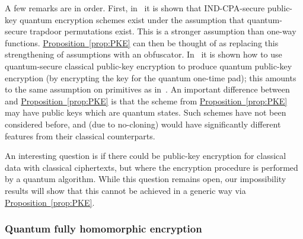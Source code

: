 \documentclass[envcountsame]{llncs}
\numberwithin{equation}{section}
\newcommand{\expref}[2]{\texorpdfstring{\hyperref[#2]{#1~\ref{#2}}}{#1~\ref{#2}}}
\begin{document}
A few remarks are in order. First, in~\cite{ABFGSS16} it is shown that IND-CPA-secure public-key quantum encryption schemes exist under the assumption that quantum-secure trapdoor permutations exist. This is a stronger assumption than one-way functions. \expref{Proposition}{prop:PKE} can then be thought of as replacing this strengthening of assumptions with an obfuscator. In~\cite{BJ15} it is shown how to use quantum-secure classical public-key encryption to produce quantum public-key encryption (by encrypting the key for the quantum one-time pad); this amounts to the same assumption on primitives as in~\cite{ABFGSS16}. An important difference between~\cite{ABFGSS16, BJ15} and \expref{Proposition}{prop:PKE} is that the scheme from \expref{Proposition}{prop:PKE} may have public keys which are quantum states. Such schemes have not been considered before, and (due to no-cloning) would have significantly different features from their classical counterparts.

An interesting question is if there could be public-key encryption for classical data with classical ciphertexts, but where the encryption procedure is performed by a quantum algorithm. While this question remains open, our impossibility results will show that this cannot be achieved in a generic way via \expref{Proposition}{prop:PKE}.

\subsubsection{Quantum fully homomorphic encryption}
\end{document}
